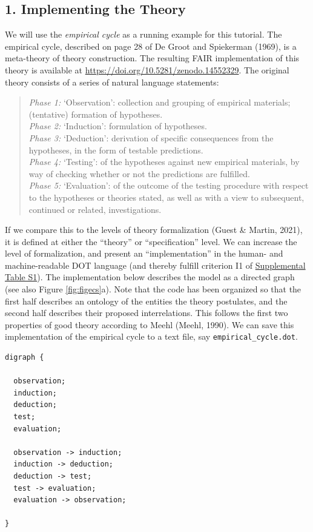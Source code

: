 \documentclass[
  man, noextraspace,floatsintext]{apa6}
\begin{document}
\subsection{1. Implementing the Theory}\label{implementing-the-theory}

We will use the \emph{empirical cycle} as a running example for this tutorial.
The empirical cycle, described on page 28 of De Groot and Spiekerman (1969),
is a meta-theory of theory construction.
The resulting FAIR implementation of this theory is available at \url{https://doi.org/10.5281/zenodo.14552329}.
The original theory consists of a series of natural language statements:

\begin{quote}
\emph{Phase 1:} `Observation': collection and grouping of empirical materials; (tentative) formation of hypotheses.\\
\emph{Phase 2:} `Induction': formulation of hypotheses.\\
\emph{Phase 3:} `Deduction': derivation of specific consequences from the hypotheses, in the form of testable predictions.\\
\emph{Phase 4:} `Testing': of the hypotheses against new empirical materials, by way of checking whether or not the predictions are fulfilled.\\
\emph{Phase 5:} `Evaluation': of the outcome of the testing procedure with respect to the hypotheses or theories stated, as well as with a view to subsequent, continued or related, investigations.
\end{quote}

If we compare this to the levels of theory formalization (Guest \& Martin, 2021),
it is defined at either the ``theory'' or ``specification'' level.
We can increase the level of formalization, and present an ``implementation'' in the human- and machine-readable DOT language (and thereby fulfill criterion I1 of \href{https://github.com/cjvanlissa/fair_theory/blob/main/fair_principles.csv}{Supplemental Table S1}).
The implementation below describes the model as a directed graph (see also Figure \ref{fig:figecs}a).
Note that the code has been organized so that the first half describes an ontology of the entities the theory postulates,
and the second half describes their proposed interrelations.
This follows the first two properties of good theory according to Meehl (Meehl, 1990).
We can save this implementation of the empirical cycle to a text file, say \texttt{empirical\_cycle.dot}.

\begin{verbatim}
digraph {

  observation;
  induction;
  deduction;
  test;
  evaluation;
  
  observation -> induction;
  induction -> deduction;
  deduction -> test;
  test -> evaluation;
  evaluation -> observation;
  
}
\end{verbatim}
\end{document}
